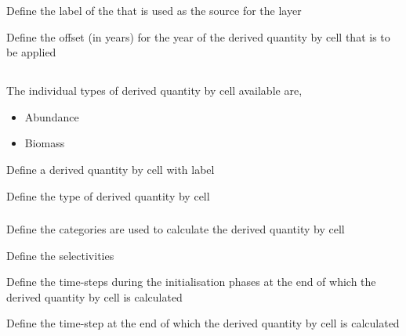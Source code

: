  {Define the label of the  that is used as the source for the layer}

 {Define the offset (in years) for the year of the derived quantity by cell that is to be applied}

\subsection{}

The individual types of derived quantity by cell available are,

\begin{itemize}
	\item Abundance
	\item Biomass
\end{itemize}

 {Define a derived quantity by cell with label}

 {Define the type of derived quantity by cell}

\subsubsection[Abundance]{}

 {Define the categories are used to calculate the derived quantity by cell}

 {Define the selectivities}

 {Define the time-steps during the initialisation phases at the end of which the derived quantity by cell is calculated}

 {Define the time-step at the end of which the derived quantity by cell is calculated}

